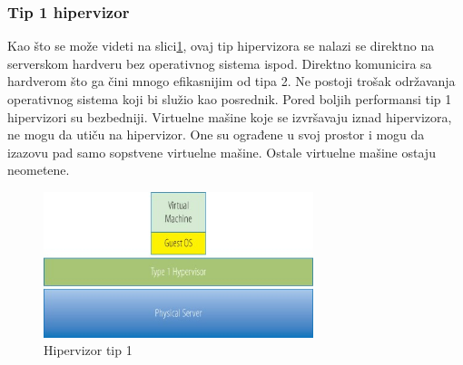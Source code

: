 \documentclass[12pt,oneside]{memoir}
\begin{document}
\subsubsection{Tip 1 hipervizor}
Kao što se može videti na slici\ref{fig:hipervizorTip1}, ovaj tip hipervizora se nalazi se direktno na serverskom hardveru bez operativnog sistema ispod. Direktno komunicira sa hardverom što ga čini mnogo efikasnijim od tipa 2. Ne postoji trošak održavanja operativnog sistema koji bi služio kao posrednik. Pored boljih performansi tip 1 hipervizori su bezbedniji. Virtuelne mašine koje se izvršavaju iznad hipervizora, ne mogu da utiču na hipervizor. One su ograđene u svoj prostor i mogu da izazovu pad samo sopstvene virtuelne mašine. Ostale virtuelne mašine ostaju neometene.
\begin{figure}[!ht]
  \centering
  \includegraphics[width=0.7\textwidth]{Slika 2.jpg}
  \caption{Hipervizor tip 1}
  \label{fig:hipervizorTip1}
\end{figure}
 
\end{document}
